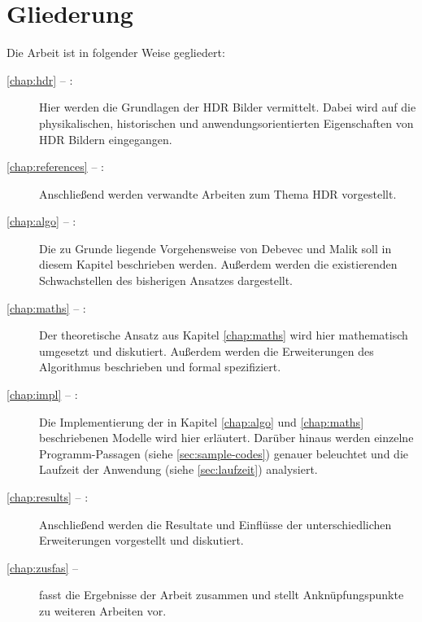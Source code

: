 \section{Gliederung}
Die Arbeit ist in folgender Weise gegliedert:
\begin{description}

\item[\autoref{chap:hdr} -- :] Hier werden die Grundlagen der \gls{HDR} Bilder vermittelt. Dabei wird auf die physikalischen, historischen und anwendungsorientierten Eigenschaften von \gls{HDR} Bildern eingegangen.

\item[\autoref{chap:references} -- :] Anschließend werden verwandte Arbeiten zum Thema \gls{HDR} vorgestellt.

\item[\autoref{chap:algo} -- :] Die zu Grunde liegende Vorgehensweise von Debevec und Malik \cite{paper} soll in diesem Kapitel beschrieben werden. Außerdem werden die existierenden Schwachstellen des bisherigen Ansatzes dargestellt.

\item[\autoref{chap:maths} -- :] Der theoretische Ansatz aus Kapitel \autoref{chap:maths} wird hier mathematisch umgesetzt und diskutiert. Außerdem werden die Erweiterungen des Algorithmus beschrieben und formal spezifiziert.

\item[\autoref{chap:impl} -- :] Die Implementierung der in Kapitel \autoref{chap:algo} und \autoref{chap:maths} beschriebenen Modelle wird hier erläutert. Darüber hinaus werden einzelne Programm-Passagen (siehe \autoref{sec:sample-codes}) genauer beleuchtet und die Laufzeit der Anwendung (siehe \autoref{sec:laufzeit}) analysiert.

\item[\autoref{chap:results} -- :] Anschließend werden die Resultate und Einflüsse der unterschiedlichen Erweiterungen vorgestellt und diskutiert.

\item[\autoref{chap:zusfas} -- ] fasst die Ergebnisse der Arbeit zusammen und stellt Anknüpfungspunkte zu weiteren Arbeiten vor.
\end{description}
